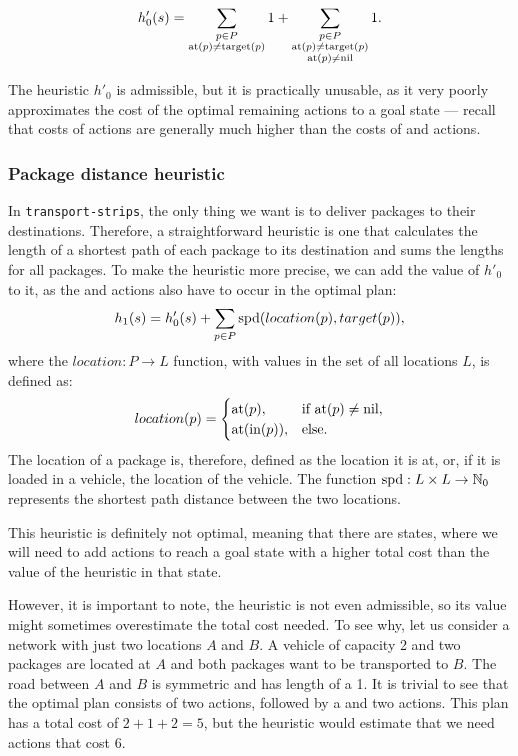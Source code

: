 $$h'_{0}(s) = \sum_{\substack{
p \in P\\ \textrm{at}(p) \neq \textrm{target}(p)}} 1
+ \sum_{\substack{
p \in P\\ \textrm{at}(p) \neq \textrm{target}(p)\\
\textrm{at}(p) \neq \textrm{nil}}} 1.$$

The heuristic $h'_0$ is admissible, but it is practically unusable, as it
very poorly approximates
the cost of the optimal remaining actions to a goal state
--- recall that costs of \drive{} actions are generally much higher than the costs of \pickup{} and \drop{} actions.

\subsubsection{Package distance heuristic}\label{sfa1}

In \texttt{transport-strips}, the only thing we want is to deliver packages to their destinations. Therefore, a straightforward heuristic is one that calculates the length of a shortest
path of each package to its destination and sums the lengths for all packages.
To make the heuristic more precise, we can add the
value of $h'_0$ to it, as the \pickup{} and \drop{}
actions also have to occur in the optimal plan:
$$h_1(s) = h'_0(s) + \sum_{p \in P} \textrm{spd}(location(p), target(p)),$$
where the $location: P \to L$ function,
with values in the set of all locations $L$, is defined as:
$$location(p) = \begin{cases}
   \textrm{at}(p), & \text{if } \textrm{at}(p) \neq \textrm{nil},\\
   \textrm{at}(\textrm{in}(p)), & \text{else}.
  \end{cases}$$
The location of a package is, therefore, defined
as the location it is at, or, if it is loaded in a vehicle,
the location of the vehicle.
The function $\textrm{spd}: L \times L \to \mathbb{N}_0$ represents
the shortest path distance between the two locations.

This heuristic is definitely not optimal, meaning that there are states,
where we will need to add actions to reach a goal state with a higher total cost than the value of the heuristic in that state.

However, it is important to note, the heuristic
is not even admissible, so its value might sometimes overestimate the total cost needed.
To see why, let us consider a network with just two locations $A$ and $B$.
A vehicle of capacity 2 and two packages are located at $A$ and both packages want to be
transported to $B$. The road between $A$ and $B$ is symmetric and has length
of a 1. It is trivial to see that the optimal plan consists of two \pickup{} actions,
followed by a \drive{} and two \drop{} actions. This plan has a total cost of $2+1+2=5$,
but the heuristic would estimate that we need actions
that cost $6$.

